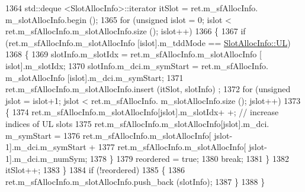 \begin{DoxyCode}
1364                                 std::deque <SlotAllocInfo>::iterator itSlot = ret.m\_sfAllocInfo.
      m\_slotAllocInfo.begin ();
1365                                 \textcolor{keywordflow}{for} (\textcolor{keywordtype}{unsigned} islot = 0; islot < ret.m\_sfAllocInfo.m\_slotAllocInfo.size ();
       islot++)
1366                                 \{
1367                                         \textcolor{keywordflow}{if} (ret.m\_sfAllocInfo.m\_slotAllocInfo [islot].m\_tddMode == 
      \hyperlink{structns3_1_1SlotAllocInfo_a6cad60db1d39034f1851e2cea625fe5da916b5be54594ead6ed677c570311cad2}{SlotAllocInfo::UL})
1368                                         \{
1369                                                 slotInfo.m\_slotIdx = ret.m\_sfAllocInfo.m\_slotAllocInfo [
      islot].m\_slotIdx;
1370                                                 slotInfo.m\_dci.m\_symStart = ret.m\_sfAllocInfo.
      m\_slotAllocInfo [islot].m\_dci.m\_symStart;
1371                                                 ret.m\_sfAllocInfo.m\_slotAllocInfo.insert (itSlot, slotInfo)
      ;
1372                                                 \textcolor{keywordflow}{for} (\textcolor{keywordtype}{unsigned} jslot = islot+1; jslot < ret.m\_sfAllocInfo.
      m\_slotAllocInfo.size (); jslot++)
1373                                                 \{
1374                                                         ret.m\_sfAllocInfo.m\_slotAllocInfo[jslot].m\_slotIdx+
      +;       \textcolor{comment}{// increase indices of UL slots}
1375                                                         ret.m\_sfAllocInfo.m\_slotAllocInfo[jslot].m\_dci.
      m\_symStart =
1376                                                                         ret.m\_sfAllocInfo.m\_slotAllocInfo[
      jslot-1].m\_dci.m\_symStart +
1377                                                                         ret.m\_sfAllocInfo.m\_slotAllocInfo[
      jslot-1].m\_dci.m\_numSym;
1378                                                 \}
1379                                                 reordered = \textcolor{keyword}{true};
1380                                                 \textcolor{keywordflow}{break};
1381                                         \}
1382                                         itSlot++;
1383                                 \}
1384                                 \textcolor{keywordflow}{if} (!reordered)
1385                                 \{
1386                                         ret.m\_sfAllocInfo.m\_slotAllocInfo.push\_back (slotInfo);
1387                                 \}
1388                         \}

\end{DoxyCode}
